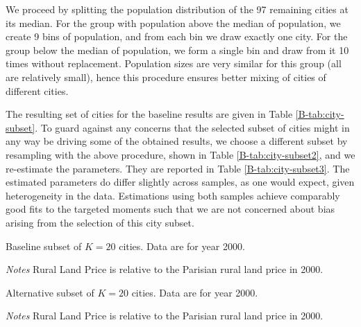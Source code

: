 \documentclass[11pt]{report}
\newcommand{\modtables}{../../output/model/tables}
\begin{document}
We proceed by splitting the population distribution of the 97 remaining cities at its median. For the group with population above the median of population, we create 9 bins of population, and from each bin we draw exactly one city. For the group below the median of population, we form a single bin and draw from it 10 times without replacement. Population sizes are very similar for this group (all are relatively small), hence this procedure ensures better mixing of cities of different cities.

The resulting set of cities for the baseline results are given in Table \ref{B-tab:city-subset}. To guard against any concerns that the selected subset of cities might in any way be driving some of the obtained results, we choose a different subset by resampling with the above procedure, shown in Table \ref{B-tab:city-subset2}, and we re-estimate the parameters. They are reported in Table \ref{B-tab:city-subset3}. The estimated parameters do differ slightly across samples, as one would expect, given heterogeneity in the data. Estimations using both samples achieve comparably good fits to the targeted moments such that we are not concerned about bias arising from the selection of this city subset.


\begin{table}[hb!]
\begin{center}
	
	\caption{Baseline subset of $K=20$ cities. Data are for year 2000.\label{B-tab:city-subset}}
\end{center}
{\footnotesize \textit{Notes} Rural Land Price is relative to the Parisian rural land price in 2000.}
\end{table}


\begin{table}[h!]
\begin{center}
	
	\caption{Alternative subset of $K=20$ cities. Data are for year 2000.\label{B-tab:city-subset2}}
\end{center}
{\footnotesize \textit{Notes} Rural Land Price is relative to the Parisian rural land price in 2000.}
\end{table}
\end{document}
